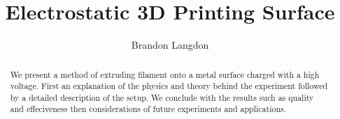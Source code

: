 \documentclass[10pt,a4paper,twocolumn]{report}
\author{Brandon Langdon}
\title{Electrostatic 3D Printing Surface}
\begin{document}
    \begin{titlepage}
    	\maketitle
    \end{titlepage}

	\begin{abstract}
		We present a method of extruding filament onto a metal surface charged with a high voltage. First an explanation of the physics and theory behind the experiment followed by a detailed description of the setup. We conclude with the results such as quality and effeciveness then considerations of future experiments and applications.
	\end{abstract}
\end{document}

